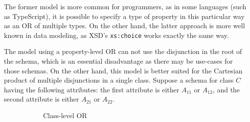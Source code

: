 The former model is more common for programmers, as in some languages (such as TypeScript), it is possible to specify a type of property in this particular way as an OR of multiple types. On the other hand, the latter approach is more well known in data modeling, as XSD's {\tt xs:choice} works exactly the same way.

The model using a property-level OR can not use the disjunction in the root of the schema, which is an essential disadvantage as there may be use-cases for those schemas. On the other hand, this model is better suited for the Cartesian product of multiple disjunctions in a single class. Suppose a schema for class $C$ having the following attributes: the first attribute is either $A_11$ or $A_12$, and the second attribute is either $A_21$ or $A_22$.

\begin{figure}[h!]\centering
  \begin{subfigure}[b]{.6\textwidth}
    \centering
    \caption{Class-level OR}
    \end{subfigure}%
    \begin{subfigure}[b]{.4\textwidth}
    \centering
\end{subfigure}
\end{figure}
